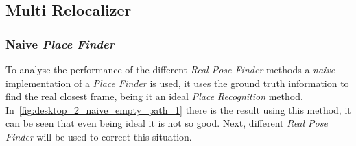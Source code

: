 \subsection{Multi Relocalizer}
\label{sub:multi_relocalizer}

\subsubsection{Naive \textit{Place Finder}}
\label{ssub:naive_and_emptry}

To analyse the performance of the different \textit{Real Pose Finder} methods a \textit{naive} implementation of a \textit{Place Finder} is used, it uses the ground truth information to find the real closest frame, being it an ideal \textit{Place Recognition} method. In~\ref{fig:desktop_2_naive_empty_path_1} there is the result using this method, it can be seen that even being ideal it is not so good. Next, different \textit{Real Pose Finder} will be used to correct this situation.\\

